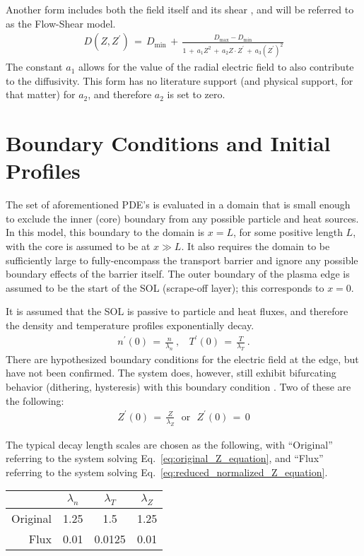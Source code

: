 Another form includes both the field itself and its shear \cite{paquay_studying_2012}, and will be referred to as the Flow-Shear model.
\begin{align} %
	D(Z, Z^{\prime}) \,=\, D_\text{min} \,+\,
		\frac{D_\text{max} - D_\text{min}}{1 \,+\, a_1 Z^2 \,+\,
		a_2 Z \cdot Z^{\prime} \,+\, a_3 (Z^{\prime})^2}
		\label{eq:flow_shear_diffusivity}
\end{align}
The constant $a_1$ allows for the value of the radial electric field to also contribute to the diffusivity.
This form has no literature support (and physical support, for that matter) for $a_2$, and therefore $a_2$ is set to zero.

\section{Boundary Conditions and Initial Profiles}\label{sec:boundary_conditions}
The set of aforementioned PDE's is evaluated in a domain that is small enough to exclude the inner (core) boundary from any possible particle and heat sources.
In this model, this boundary to the domain is $x = L$, for some positive length $L$, with the core is assumed to be at $x \gg L$.
It also requires the domain to be sufficiently large to fully-encompass the transport barrier and ignore any possible boundary effects of the barrier itself.
The outer boundary of the plasma edge is assumed to be the start of the SOL (scrape-off layer); this corresponds to $x = 0$.

It is assumed that the SOL is passive to particle and heat fluxes, and therefore the density and temperature profiles exponentially decay.
\begin{align} %
	n^\prime(0) \,=\, \frac{n}{\lambda_n}~, ~~~~
		T^\prime(0) \,=\, \frac{T}{\lambda_T}~. \label{eq:SOL_boundary}
\end{align}
There are hypothesized boundary conditions for the electric field at the edge, but have not been confirmed.
The system does, however, still exhibit bifurcating behavior (dithering, hysteresis) with this boundary condition \cite{paquay_studying_2012}.
Two of these are the following:
\begin{align} %
	Z^\prime(0) \,=\, \frac{Z}{\lambda_Z} ~~~ \text{or} ~~~ Z^\prime(0) \,=\,
		0 \label{eq:Z_edge_conds}
\end{align}

The typical decay length scales are chosen as the following, with ``Original'' referring to the system solving Eq.~\ref{eq:original_Z_equation}, and ``Flux'' referring to the system solving Eq.~\ref{eq:reduced_normalized_Z_equation}.
\begin{table}[h] %
\centering
\begin{tabular}{r|ccc}
	& $\lambda_n$ & $\lambda_T$ & $\lambda_Z$ \\ \hline
	Original & 1.25 & 1.5 & 1.25 \\ \hline
	Flux & 0.01 & 0.0125 & 0.01
\end{tabular}
\end{table}

